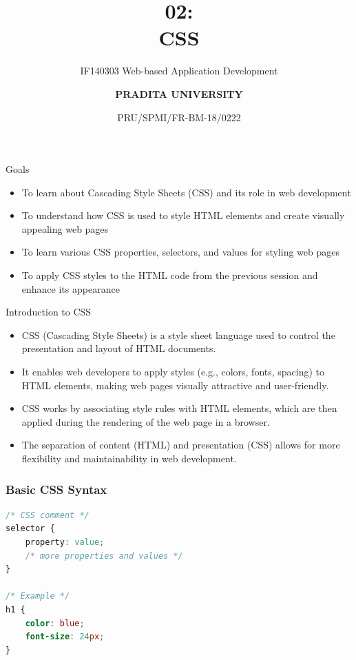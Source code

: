 \documentclass[aspectratio=169, table]{beamer}
\subtitle{ IF140303 Web-based Application Development}
\title{\Huge {\textbf{02: \\CSS}}}
\date[Serial]{\scriptsize {PRU/SPMI/FR-BM-18/0222}}
\author[Pradita]{\small {\textbf{PRADITA UNIVERSITY}}}
\begin{document}
\begin{frame}
    \titlepage
\end{frame}

\begin{frame}{Goals}
    \vskip-1cm
    \begin{itemize}
        \item To learn about Cascading Style Sheets (CSS) and its role in web development
        \item To understand how CSS is used to style HTML elements and create visually appealing web pages
        \item To learn various CSS properties, selectors, and values for styling web pages
        \item To apply CSS styles to the HTML code from the previous session and enhance its appearance
    \end{itemize}
\end{frame}

\begin{frame}{Introduction to CSS}
    \vskip-0.5cm
    \begin{itemize}
        \item CSS (Cascading Style Sheets) is a style sheet language used to control the presentation and layout of HTML documents.
        \item It enables web developers to apply styles (e.g., colors, fonts, spacing) to HTML elements, making web pages visually attractive and user-friendly.
        \item CSS works by associating style rules with HTML elements, which are then applied during the rendering of the web page in a browser.
        \item The separation of content (HTML) and presentation (CSS) allows for more flexibility and maintainability in web development.
    \end{itemize}
\end{frame}

\begin{frame}[fragile] %
    \frametitle{Basic CSS Syntax}
    \vskip0.5cm
    \begin{lstlisting}[language=CSS]
/* CSS comment */
selector {
    property: value;
    /* more properties and values */
}

/* Example */
h1 {
    color: blue;
    font-size: 24px;
}
    \end{lstlisting}
\end{frame}
\end{document}
